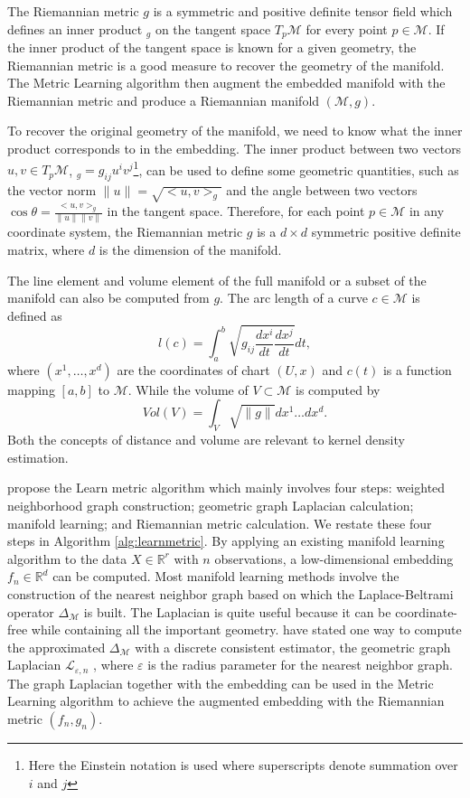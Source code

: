 \documentclass[11pt,a4paper,]{article}
\begin{document}
The Riemannian metric \(g\) is a symmetric and positive definite tensor field which defines an inner product \(<,>_g\) on the tangent space \(T_p\mathcal{M}\) for every point \(p \in \mathcal{M}\).
If the inner product of the tangent space is known for a given geometry, the Riemannian metric is a good measure to recover the geometry of the manifold.
The Metric Learning algorithm \autocite{Perrault-Joncas2013-pq} then augment the embedded manifold with the Riemannian metric and produce a Riemannian manifold \((\mathcal{M}, g)\).

To recover the original geometry of the manifold, we need to know what the inner product corresponds to in the embedding.
The inner product between two vectors \(u,v \in T_p\mathcal{M}\), \(<u,v>_g=g_{ij}u^iv^j\)\footnote{Here the Einstein notation is used where superscripts denote summation over \(i\) and \(j\)}, can be used to define some geometric quantities, such as the vector norm \(\|u\|=\sqrt{<u,v>_g}\) and the angle between two vectors \(\cos{\theta}=\frac{<u,v>_g}{\|u\|\|v\|}\) in the tangent space. Therefore, for each point \(p\in \mathcal{M}\) in any coordinate system, the Riemannian metric \(g\) is a \(d\times d\) symmetric positive definite matrix, where \(d\) is the dimension of the manifold.

The line element and volume element of the full manifold or a subset of the manifold can also be computed from \(g\). The arc length of a curve \(c\in \mathcal{M}\) is defined as
\[
l(c)=\int_a^b \sqrt{g_{ij} \frac{dx^i}{dt} \frac{dx^j}{dt}} dt,
\]
where \((x^1,\dots,x^d)\) are the coordinates of chart \((U,x)\) and \(c(t)\) is a function mapping \([a,b]\) to \(\mathcal{M}\). While the volume of \(V\subset \mathcal{M}\) is computed by
\[
Vol(V)=\int_V \sqrt{\|g\|} dx^1\dots dx^d.
\]
Both the concepts of distance and volume are relevant to kernel density estimation.

\textcite{Perrault-Joncas2013-pq} propose the Learn metric algorithm which mainly involves four steps: weighted neighborhood graph construction; geometric graph Laplacian calculation; manifold learning; and Riemannian metric calculation. We restate these four steps in Algorithm \ref{alg:learnmetric}.
By applying an existing manifold learning algorithm to the data \(X\in \mathbb{R}^r\) with \(n\) observations, a low-dimensional embedding \(f_n \in \mathbb{R}^d\) can be computed. Most manifold learning methods involve the construction of the nearest neighbor graph based on which the Laplace-Beltrami operator \(\Delta_\mathcal{M}\) is built. The Laplacian is quite useful because it can be coordinate-free while containing all the important geometry. \textcite{Perrault-Joncas2013-pq} have stated one way to compute the approximated \(\Delta_\mathcal{M}\) with a discrete consistent estimator, the geometric graph Laplacian \(\mathcal{L}_{\varepsilon,n}\) \autocite{Zhou2011-za}, where \(\varepsilon\) is the radius parameter for the nearest neighbor graph. The graph Laplacian together with the embedding can be used in the Metric Learning algorithm to achieve the augmented embedding with the Riemannian metric \((f_n, g_n)\).
\end{document}
